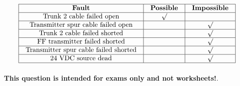 






$$\vbox{\offinterlineskip
\halign{\strut
\vrule \quad\hfil # \ \hfil & 
\vrule \quad\hfil # \ \hfil & 
\vrule \quad\hfil # \ \hfil \vrule \cr
\noalign{\hrule}
%
{\bf Fault} & {\bf Possible} & {\bf Impossible} \cr
%
%
%
\noalign{\hrule}
%
Trunk 2 cable failed open & $\surd$ &  \cr
%
\noalign{\hrule}
%
Transmitter spur cable failed open &  & $\surd$ \cr
%
%
%
%
%
\noalign{\hrule}
%
Trunk 2 cable failed shorted &  & $\surd$ \cr
%
\noalign{\hrule}
%
FF transmitter failed shorted &  & $\surd$ \cr
%
%
%
\noalign{\hrule}
%
Transmitter spur cable failed shorted &  & $\surd$ \cr
%
%
%
\noalign{\hrule}
%
24 VDC source dead &  & $\surd$ \cr
%
\noalign{\hrule}
} %
}$$ %








{\bf This question is intended for exams only and not worksheets!}.


